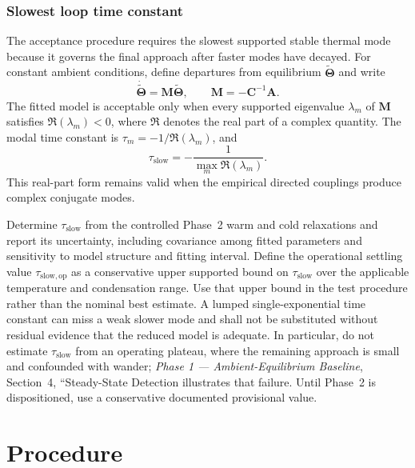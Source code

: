 \documentclass[11pt]{article}
\newcommand{\Realpart}[1]{\Re\left(#1\right)}
\newcommand{\PhaseOneDoc}{\textit{Phase 1 --- Ambient-Equilibrium Baseline}}
\begin{document}
\subsubsection{Slowest loop time constant}
\label{sec:tau_slow}

The acceptance procedure requires the slowest supported stable thermal mode because it governs the final approach after faster modes have decayed. For constant ambient conditions, define departures from equilibrium $\widetilde{\boldsymbol\Theta}$ and write
\begin{equation}
    \dot{\widetilde{\boldsymbol\Theta}}
    =
    \mathbf M\widetilde{\boldsymbol\Theta},
    \qquad
    \mathbf M=-\mathbf C^{-1}\mathbf A.
    \label{eq:state_matrix}
\end{equation}
The fitted model is acceptable only when every supported eigenvalue $\lambda_m$ of $\mathbf M$ satisfies $\Realpart{\lambda_m}<0$, where $\Re$ denotes the real part of a complex quantity. The modal time constant is $\tau_m=-1/\Realpart{\lambda_m}$, and
\begin{equation}
    \tau_{\mathrm{slow}}
    =
    -\frac{1}{\max_m\Realpart{\lambda_m}}.
    \label{eq:tau_slow}
\end{equation}
This real-part form remains valid when the empirical directed couplings produce complex conjugate modes.

Determine $\tau_{\mathrm{slow}}$ from the controlled Phase~2 warm and cold relaxations and report its uncertainty, including covariance among fitted parameters and sensitivity to model structure and fitting interval. Define the operational settling value $\tau_{\mathrm{slow,op}}$ as a conservative upper supported bound on $\tau_{\mathrm{slow}}$ over the applicable temperature and condensation range. Use that upper bound in the test procedure rather than the nominal best estimate. A lumped single-exponential time constant can miss a weak slower mode and shall not be substituted without residual evidence that the reduced model is adequate. In particular, do not estimate $\tau_{\mathrm{slow}}$ from an operating plateau, where the remaining approach is small and confounded with wander; \PhaseOneDoc, Section~4, ``Steady-State Detection illustrates that failure. Until Phase~2 is dispositioned, use a conservative documented provisional value.



\clearpage
\section{Procedure}
\label{sec:procedure}
\label{sec:test_procedure}
\label{sec:relaxation}
\end{document}
